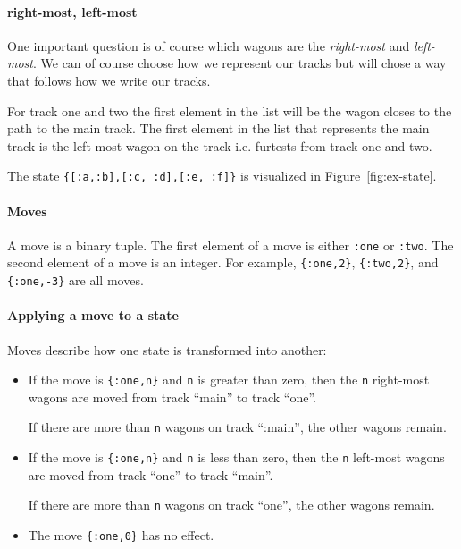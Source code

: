 \documentclass[a4paper,11pt]{article}
\begin{document}
\paragraph{right-most, left-most}

One important question is of course which wagons are the {\em
 right-most} and {\em left-most}. We can of course choose how we
represent our tracks but will chose a way that follows how we write our tracks.

For track one and two the first element in the list will be the wagon
closes to the path to the main track. The first element in the list
that represents the main track is the left-most wagon on the track
i.e. furtests from track one and two.

The state \verb+{[:a,:b],[:c, :d],[:e, :f]}+
is visualized in Figure~\ref{fig:ex-state}.


\paragraph{Moves}

A move is a binary tuple. The first element of a move is either
\verb+:one+ or \verb+:two+. The second element of a move is an
integer. For example, \verb+{:one,2}+, \verb+{:two,2}+, and
\verb+{:one,-3}+ are all moves.

\paragraph{Applying a move to a state}

Moves describe how one state is transformed into another:
\begin{itemize}
\item If the move is \verb+{:one,n}+ and \verb+n+ is greater than
  zero, then the \verb+n+ right-most wagons are moved from track
  ``main'' to track ``one''.

  If there are more than \verb+n+ wagons on track ``:main'', the
  other wagons remain.

\item If the move is \verb+{:one,n}+ and \verb+n+ is less than zero,
  then the \verb+n+ left-most wagons are moved from track ``one''
  to track ``main''.

  If there are more than \verb+n+ wagons on track ``one'', the
  other wagons remain.
\item The move \verb+{:one,0}+ has no effect.
\end{itemize}
\end{document}

